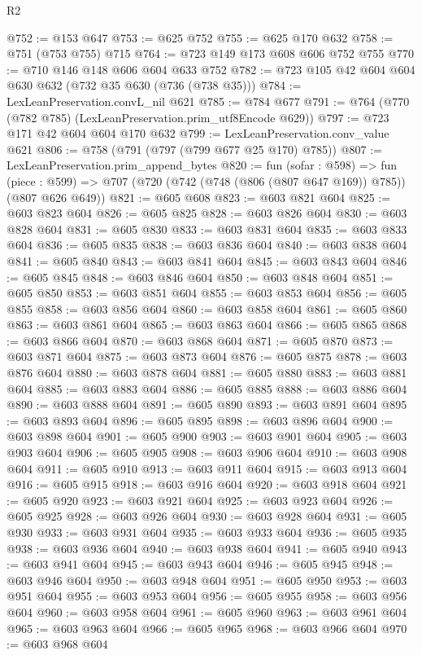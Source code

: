 \begin{lexlean}{R2}
\begin{coremodule}
@752 := @153 @647
@753 := @625 @752
@755 := @625 @170 @632
@758 := @751 (@753 @755) @715
@764 := @723 @149 @173 @608 @606 @752 @755
@770 := @710 @146 @148 @606 @604 @633 @752
@782 := @723 @105 @42 @604 @604 @630 @632 (@732 @35 @630 (@736 (@738 @35)))
@784 := LexLeanPreservation.convL_nil @621
@785 := @784 @677
@791 := @764 (@770 (@782 @785) (LexLeanPreservation.prim_utf8Encode @629))
@797 := @723 @171 @42 @604 @604 @170 @632
@799 := LexLeanPreservation.conv_value @621
@806 := @758 (@791 (@797 (@799 @677 @25 @170) @785))
@807 := LexLeanPreservation.prim_append_bytes
@820 := fun (sofar : @598) =>
  fun (piece : @599) => @707 (@720 (@742 (@748 (@806 (@807 @647 @169)) @785)) (@807 @626 @649))
@821 := @605 @608
@823 := @603 @821 @604
@825 := @603 @823 @604
@826 := @605 @825
@828 := @603 @826 @604
@830 := @603 @828 @604
@831 := @605 @830
@833 := @603 @831 @604
@835 := @603 @833 @604
@836 := @605 @835
@838 := @603 @836 @604
@840 := @603 @838 @604
@841 := @605 @840
@843 := @603 @841 @604
@845 := @603 @843 @604
@846 := @605 @845
@848 := @603 @846 @604
@850 := @603 @848 @604
@851 := @605 @850
@853 := @603 @851 @604
@855 := @603 @853 @604
@856 := @605 @855
@858 := @603 @856 @604
@860 := @603 @858 @604
@861 := @605 @860
@863 := @603 @861 @604
@865 := @603 @863 @604
@866 := @605 @865
@868 := @603 @866 @604
@870 := @603 @868 @604
@871 := @605 @870
@873 := @603 @871 @604
@875 := @603 @873 @604
@876 := @605 @875
@878 := @603 @876 @604
@880 := @603 @878 @604
@881 := @605 @880
@883 := @603 @881 @604
@885 := @603 @883 @604
@886 := @605 @885
@888 := @603 @886 @604
@890 := @603 @888 @604
@891 := @605 @890
@893 := @603 @891 @604
@895 := @603 @893 @604
@896 := @605 @895
@898 := @603 @896 @604
@900 := @603 @898 @604
@901 := @605 @900
@903 := @603 @901 @604
@905 := @603 @903 @604
@906 := @605 @905
@908 := @603 @906 @604
@910 := @603 @908 @604
@911 := @605 @910
@913 := @603 @911 @604
@915 := @603 @913 @604
@916 := @605 @915
@918 := @603 @916 @604
@920 := @603 @918 @604
@921 := @605 @920
@923 := @603 @921 @604
@925 := @603 @923 @604
@926 := @605 @925
@928 := @603 @926 @604
@930 := @603 @928 @604
@931 := @605 @930
@933 := @603 @931 @604
@935 := @603 @933 @604
@936 := @605 @935
@938 := @603 @936 @604
@940 := @603 @938 @604
@941 := @605 @940
@943 := @603 @941 @604
@945 := @603 @943 @604
@946 := @605 @945
@948 := @603 @946 @604
@950 := @603 @948 @604
@951 := @605 @950
@953 := @603 @951 @604
@955 := @603 @953 @604
@956 := @605 @955
@958 := @603 @956 @604
@960 := @603 @958 @604
@961 := @605 @960
@963 := @603 @961 @604
@965 := @603 @963 @604
@966 := @605 @965
@968 := @603 @966 @604
@970 := @603 @968 @604

\end{coremodule}
\end{lexlean}
